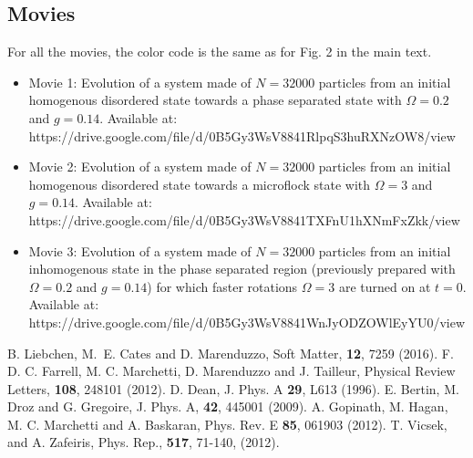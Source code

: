 \documentclass[aps,twocolumn,showlabels,showrefs,amsmath,amssymb,pre,superscriptaddress, floatfix, colors]{revtex4}
\newcommand{\1}{\begin{equation}}
\newcommand{\2}{\end{equation}}
\newcommand{\4}[2]{{\frac{#1}{#2}}}
\begin{document}
\subsection{Movies}
For all the movies, the color code is the same as for Fig. 2 in the main text. 

\begin{itemize}
\item Movie 1: Evolution of a system made of $N=32000$ particles from an initial homogenous disordered state towards a phase separated state with $\Omega=0.2$ and $g=0.14$. Available at: https://drive.google.com/file/d/0B5Gy3WsV8841RlpqS3huRXNzOW8/view
\item Movie 2: Evolution of a system made of $N=32000$ particles from an initial homogenous disordered state towards a microflock state with $\Omega=3$ and $g=0.14$.  Available at: https://drive.google.com/file/d/0B5Gy3WsV8841TXFnU1hXNmFxZkk/view 
\item Movie 3: Evolution of a system made of $N=32000$ particles from an initial inhomogenous  state in the phase separated region (previously prepared with $\Omega=0.2$ and $g=0.14$) for which faster rotations $\Omega=3$ are turned on at $t=0$.  Available at: https://drive.google.com/file/d/0B5Gy3WsV8841WnJyODZOWlEyYU0/view
\end{itemize}





\begin{thebibliography}{9}
 B. Liebchen, M.~E. Cates and D. Marenduzzo, { Soft Matter}, {\bf 12}, 7259 (2016).
 F. D. C. Farrell, M. C. Marchetti, D. Marenduzzo and J. Tailleur, { Physical Review Letters}, {\bf 108}, 248101 (2012). 
 D. Dean, J. Phys. A {\bf 29}, L613 (1996).
 E. Bertin, M. Droz and G. Gregoire, { J. Phys. A}, {\bf 42}, 445001 (2009).
 A. Gopinath, M. Hagan, M. C. Marchetti and A. Baskaran,  {Phys. Rev. E} {\bf 85}, 061903 (2012).
 T. Vicsek, and A. Zafeiris,  Phys. Rep., {\bf 517}, 71-140,  (2012).
\end{thebibliography}
\end{document}
